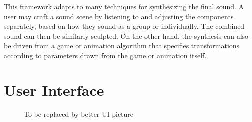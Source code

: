 \documentclass{acmsiggraph}               %
\begin{document}
This framework adapts to many techniques for synthesizing the final sound. A user may 
craft a sound scene by listening to and adjusting the components separately, based on how they 
sound as a group or individually. The combined sound can then be similarly sculpted. On the other 
hand, the synthesis can also be driven from a game or animation algorithm that specifies 
transformations according to parameters drawn from the game or animation itself.



\section{User Interface}

\begin{figure}[h]
\centering
\caption{To be replaced by better UI picture}
\label{fig:ui}
\end{figure}
\end{document}
